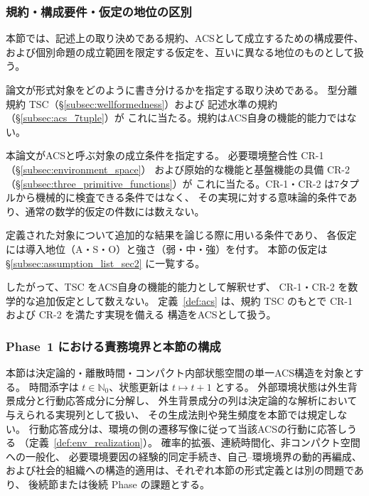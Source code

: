 \subsubsection{規約・構成要件・仮定の地位の区別}
\label{subsubsec:s2_requirement_status}

本節では、記述上の取り決めである規約、ACSとして成立するための構成要件、
および個別命題の成立範囲を限定する仮定を、互いに異なる地位のものとして扱う。

\begin{description}[style=nextline]
  \item[規約（Convention）]
  論文が形式対象をどのように書き分けるかを指定する取り決めである。
  型分離規約 TSC（\S\ref{subsec:wellformedness}）および
  記述水準の規約（\S\ref{subsec:acs_7tuple}）が
  これに当たる。規約はACS自身の機能的能力ではない。
  \item[構成要件（Constitutive Requirement; CR）]
  本論文がACSと呼ぶ対象の成立条件を指定する。
  必要環境整合性 CR-1（\S\ref{subsec:environment_space}）
  および原始的な機能と基盤機能の具備 CR-2
  （\S\ref{subsec:three_primitive_functions}）が
  これに当たる。CR-1・CR-2 は7タプルから機械的に検査できる条件ではなく、
  その実現に対する意味論的条件であり、通常の数学的仮定の件数には数えない。
  \item[仮定（Assumption）]
  定義された対象について追加的な結果を論じる際に用いる条件であり、
  各仮定には導入地位（A・S・O）と強さ（弱・中・強）を付す。
  本節の仮定は \S\ref{subsec:assumption_list_sec2} に一覧する。
\end{description}

したがって、TSC をACS自身の機能的能力として解釈せず、
CR-1・CR-2 を数学的な追加仮定として数えない。
定義~\ref{def:acs} は、規約 TSC のもとで CR-1 および CR-2 を満たす実現を備える
構造をACSとして扱う。

\subsubsection{Phase~1 における責務境界と本節の構成}
\label{subsubsec:s2_phase1_boundary}

本節は決定論的・離散時間・コンパクト内部状態空間の単一ACS構造を対象とする。
時間添字は $t\in\mathbb N_0$、状態更新は $t\mapsto t+1$ とする。
外部環境状態は外生背景成分と行動応答成分に分解し、
外生背景成分の列は決定論的な解析において与えられる実現列として扱い、
その生成法則や発生頻度を本節では規定しない。
行動応答成分は、環境の側の遷移写像に従って当該ACSの行動に応答しうる
（定義~\ref{def:env_realization}）。
確率的拡張、連続時間化、非コンパクト空間への一般化、
必要環境要因の経験的同定手続き、自己--環境境界の動的再編成、
および社会的組織への構造的適用は、それぞれ本節の形式定義とは別の問題であり、
後続節または後続 Phase の課題とする。

